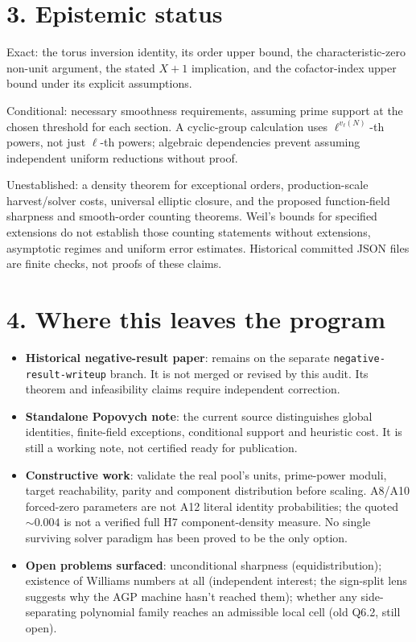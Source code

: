 \documentclass[10pt]{article}
\begin{document}
\section*{3. Epistemic status}

Exact: the torus inversion identity, its order upper bound, the
characteristic-zero non-unit argument, the stated $X+1$ implication, and
the cofactor-index upper bound under its explicit assumptions.

Conditional: necessary smoothness requirements, assuming prime support at
the chosen threshold for each section. A cyclic-group calculation uses
$\ell^{v_\ell(N)}$-th powers, not just $\ell$-th powers; algebraic dependencies
prevent assuming independent uniform reductions without proof.

Unestablished: a density theorem for exceptional orders, production-scale
harvest/solver costs, universal elliptic closure, and the proposed
function-field sharpness and smooth-order counting theorems. Weil's bounds
for specified extensions do not establish those counting statements without
extensions, asymptotic regimes and uniform error estimates.
Historical committed JSON files are finite checks, not proofs of these claims.

\section*{4. Where this leaves the program}

\begin{itemize}\itemsep1pt
\item \textbf{Historical negative-result paper}: remains on the separate
\texttt{negative-result-writeup} branch. It is not merged or revised by this
audit. Its theorem and infeasibility claims require independent correction.
\item \textbf{Standalone Popovych note}: the current source distinguishes
global identities, finite-field exceptions, conditional support and heuristic
cost. It is still a working note, not certified ready for publication.
\item \textbf{Constructive work}: validate the real pool's units, prime-power
moduli, target reachability, parity and component distribution before scaling.
A8/A10 forced-zero parameters are not A12 literal identity probabilities;
the quoted ${\sim}0.004$ is not a verified full H7 component-density measure.
No single surviving solver paradigm has been proved to be the only option.
\item \textbf{Open problems surfaced}: unconditional sharpness
(equidistribution); existence of Williams numbers at all (independent
interest; the sign-split lens suggests why the AGP machine hasn't reached
them); whether any side-separating polynomial family reaches an admissible
local cell (old Q6.2, still open).
\end{itemize}
\end{document}
